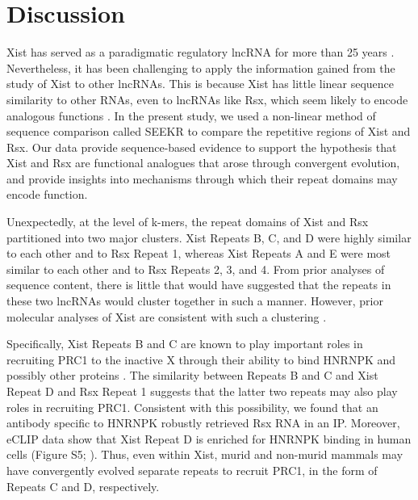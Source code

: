 \section{Discussion}
Xist has served as a paradigmatic regulatory lncRNA for more than 25 years \cite{Brockdorff2018LocalNcRNA,Balaton2018TheChromosome,DaRocha2017NovelConformation,Sahakyan2018TheCompensation}. Nevertheless, it has been challenging to apply the information gained from the study of Xist to other lncRNAs. This is because Xist has little linear sequence similarity to other RNAs, even to lncRNAs like Rsx, which seem likely to encode analogous functions \cite{Grant2012RsxInactivation,Wang2014Chromosome-wideDomestica}. In the present study, we used a non-linear method of sequence comparison called SEEKR \cite{Kirk2018FunctionalContent} to compare the repetitive regions of Xist and Rsx. Our data provide sequence-based evidence to support the hypothesis that Xist and Rsx are functional analogues that arose through convergent evolution, and provide insights into mechanisms through which their repeat domains may encode function. 

Unexpectedly, at the level of k-mers, the repeat domains of Xist and Rsx partitioned into two major clusters. Xist Repeats B, C, and D were highly similar to each other and to Rsx Repeat 1, whereas Xist Repeats A and E were most similar to each other and to Rsx Repeats 2, 3, and 4. From prior analyses of sequence content, there is little that would have suggested that the repeats in these two lncRNAs would cluster together in such a manner. However, prior molecular analyses of Xist are consistent with such a clustering \cite{Brockdorff2018LocalNcRNA,Balaton2018TheChromosome,DaRocha2017NovelConformation,Sahakyan2018TheCompensation}. 

Specifically, Xist Repeats B and C are known to play important roles in recruiting PRC1 to the inactive X through their ability to bind HNRNPK and possibly other proteins \cite{Pintacuda2017HnRNPKSilencing}. The similarity between Repeats B and C and Xist Repeat D and Rsx Repeat 1 suggests that the latter two repeats may also play roles in recruiting PRC1. Consistent with this possibility, we found that an antibody specific to HNRNPK robustly retrieved Rsx RNA in an IP. Moreover, eCLIP data show that Xist Repeat D is enriched for HNRNPK binding in human cells (Figure S5; \cite{VanNostrand2016RobusteCLIP}). Thus, even within Xist, murid and non-murid mammals may have convergently evolved separate repeats to recruit PRC1, in the form of Repeats C and D, respectively.

